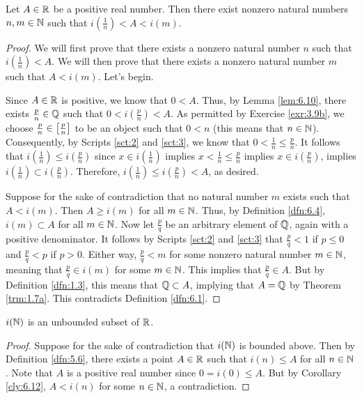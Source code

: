 \documentclass[../main.tex]{subfiles}
\begin{document}
\begin{corollary}\label{cly:6.12}
    Let $A\in\mathbb{R}$ be a positive real number. Then there exist nonzero natural numbers $n,m\in\mathbb{N}$ such that $i(\frac{1}{n})<A<i(m)$.
    \begin{proof}
        We will first prove that there exists a nonzero natural number $n$ such that $i(\frac{1}{n})<A$. We will then prove that there exists a nonzero natural number $m$ such that $A<i(m)$. Let's begin.\par
        Since $A\in\mathbb{R}$ is positive, we know that $0<A$. Thus, by Lemma \ref{lem:6.10}, there exists $\frac{p}{n}\in\mathbb{Q}$ such that $0<i(\frac{p}{n})<A$. As permitted by Exercise \ref{exr:3.9b}, we choose $\frac{p}{n}\in\left[ \frac{p}{n} \right]$ to be an object such that $0<n$ (this means that $n\in\mathbb{N}$). Consequently, by Scripts \ref{sct:2} and \ref{sct:3}, we know that $0<\frac{1}{n}\leq\frac{p}{n}$. It follows that $i(\frac{1}{n})\leq i(\frac{p}{n})$ since $x\in i(\frac{1}{n})$ implies $x<\frac{1}{n}\leq\frac{p}{n}$ implies $x\in i(\frac{p}{n})$, implies $i(\frac{1}{n})\subset i(\frac{p}{n})$. Therefore, $i(\frac{1}{n})\leq i(\frac{p}{n})<A$, as desired.\par
        Suppose for the sake of contradiction that no natural number $m$ exists such that $A<i(m)$. Then $A\geq i(m)$ for all $m\in\mathbb{N}$. Thus, by Definition \ref{dfn:6.4}, $i(m)\subset A$ for all $m\in\mathbb{N}$. Now let $\frac{p}{q}$ be an arbitrary element of $\mathbb{Q}$, again with a positive denominator. It follows by Scripts \ref{sct:2} and \ref{sct:3} that $\frac{p}{q}<1$ if $p\leq 0$ and $\frac{p}{q}<p$ if $p>0$. Either way, $\frac{p}{q}<m$ for some nonzero natural number $m\in\mathbb{N}$, meaning that $\frac{p}{q}\in i(m)$ for some $m\in\mathbb{N}$. This implies that $\frac{p}{q}\in A$. But by Definition \ref{dfn:1.3}, this means that $\mathbb{Q}\subset A$, implying that $A=\mathbb{Q}$ by Theorem \ref{trm:1.7a}. This contradicts Definition \ref{dfn:6.1}.
    \end{proof}
\end{corollary}

\begin{corollary}\label{cly:6.13}
    $i(\mathbb{N})$ is an unbounded subset of $\mathbb{R}$.
    \begin{proof}
        Suppose for the sake of contradiction that $i(\mathbb{N})$ is bounded above. Then by Definition \ref{dfn:5.6}, there exists a point $A\in\mathbb{R}$ such that $i(n)\leq A$ for all $n\in\mathbb{N}$. Note that $A$ is a positive real number since $0=i(0)\leq A$. But by Corollary \ref{cly:6.12}, $A<i(n)$ for some $n\in\mathbb{N}$, a contradiction.
    \end{proof}
\end{corollary}
\end{document}
